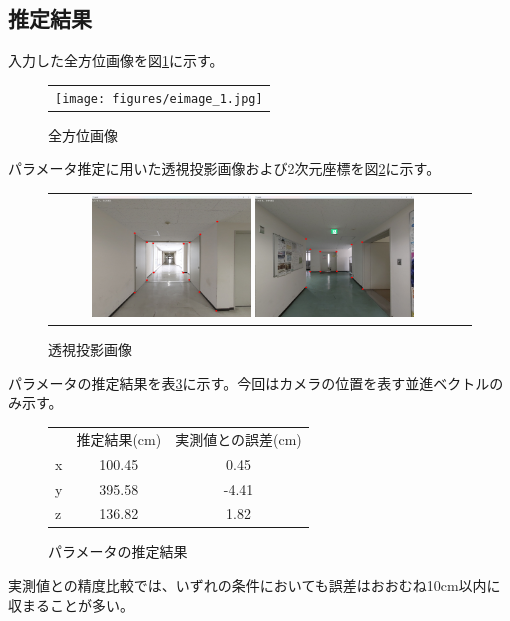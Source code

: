 \documentclass[]{jarticle}          %
\begin{document}
\subsection{推定結果}
入力した全方位画像を図\ref{one}に示す。
\begin{figure}[H]
  \begin{center}
    \begin{tabular}{c}
      \texttt{[image: figures/eimage\_1.jpg]}
    \end{tabular}
  \end{center}
  \caption{全方位画像}
  \label{one}
\end{figure}
パラメータ推定に用いた透視投影画像および2次元座標を図\ref{two}に示す。
\begin{figure}[H]
  \begin{center}
    \begin{tabular}{cc}
      \includegraphics[width=0.4\textwidth]{figures/cam0.png}
      \includegraphics[width=0.4\textwidth]{figures/cam1.png}\\
    \end{tabular}
  \end{center}
  \caption{透視投影画像}
  \label{two}
\end{figure}
パラメータの推定結果を表\ref{three}に示す。今回はカメラの位置を表す並進ベクトルのみ示す。
\begin{figure}[H]
  \begin{center}
    \begin{tabular}{lcc}
    & 推定結果(cm) & 実測値との誤差(cm) \\
    x & 100.45 & 0.45 \\
    y & 395.58 & -4.41 \\
    z & 136.82 & 1.82
    \end{tabular}
  \end{center}
  \caption{パラメータの推定結果}
  \label{three}
\end{figure}
実測値との精度比較では、いずれの条件においても誤差はおおむね10cm以内に収まることが多い。
\end{document}
